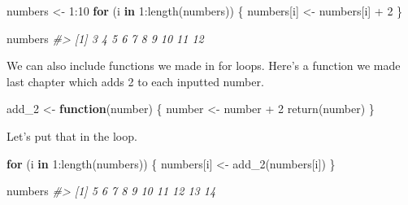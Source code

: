 \documentclass[
]{krantz}
\makeatletter
\newenvironment{Shaded}{\begin{snugshade}}{\end{snugshade}}
\newcommand{\CommentTok}[1]{\textcolor[rgb]{0.37,0.37,0.37}{\textit{#1}}}
\newcommand{\ControlFlowTok}[1]{\textcolor[rgb]{0.27,0.27,0.27}{\textbf{#1}}}
\newcommand{\DecValTok}[1]{\textcolor[rgb]{0.06,0.06,0.06}{#1}}
\newcommand{\FunctionTok}[1]{\textcolor[rgb]{0,0,0}{#1}}
\newcommand{\NormalTok}[1]{#1}
\newcommand{\OtherTok}[1]{\textcolor[rgb]{0.37,0.37,0.37}{#1}}
\newcommand{\SpecialCharTok}[1]{\textcolor[rgb]{0,0,0}{#1}}
\newenvironment{kframe}{%
\medskip{}
\setlength{\fboxsep}{.8em}
 \def\at@end@of@kframe{}%
 \ifinner\ifhmode%
  \def\at@end@of@kframe{\end{minipage}}%
  \begin{minipage}{\columnwidth}%
 \fi\fi%
 \def\FrameCommand##1{\hskip\@totalleftmargin \hskip-\fboxsep
 \colorbox{shadecolor}{##1}\hskip-\fboxsep
     \hskip-\linewidth \hskip-\@totalleftmargin \hskip\columnwidth}%
 \MakeFramed {\advance\hsize-\width
   \@totalleftmargin\z@ \linewidth\hsize
   \@setminipage}}%
 {\par\unskip\endMakeFramed%
 \at@end@of@kframe}
\renewenvironment{Shaded}{\begin{kframe}}{\end{kframe}}
\makeatother
\begin{document}
\begin{Shaded}
\begin{Highlighting}[]
\NormalTok{numbers }\OtherTok{\textless{}{-}} \DecValTok{1}\SpecialCharTok{:}\DecValTok{10}
\ControlFlowTok{for}\NormalTok{ (i }\ControlFlowTok{in} \DecValTok{1}\SpecialCharTok{:}\FunctionTok{length}\NormalTok{(numbers)) \{}
\NormalTok{  numbers[i] }\OtherTok{\textless{}{-}}\NormalTok{ numbers[i] }\SpecialCharTok{+} \DecValTok{2}
\NormalTok{\}}
\end{Highlighting}
\end{Shaded}

\begin{Shaded}
\begin{Highlighting}[]
\NormalTok{numbers}
\CommentTok{\#\textgreater{}  [1]  3  4  5  6  7  8  9 10 11 12}
\end{Highlighting}
\end{Shaded}

We can also include functions we made in for loops. Here's a
function we made last chapter which adds 2 to each inputted
number.

\begin{Shaded}
\begin{Highlighting}[]
\NormalTok{add\_2 }\OtherTok{\textless{}{-}} \ControlFlowTok{function}\NormalTok{(number) \{}
\NormalTok{  number }\OtherTok{\textless{}{-}}\NormalTok{ number }\SpecialCharTok{+} \DecValTok{2}
  \FunctionTok{return}\NormalTok{(number)}
\NormalTok{\}}
\end{Highlighting}
\end{Shaded}

Let's put that in the loop.

\begin{Shaded}
\begin{Highlighting}[]
\ControlFlowTok{for}\NormalTok{ (i }\ControlFlowTok{in} \DecValTok{1}\SpecialCharTok{:}\FunctionTok{length}\NormalTok{(numbers)) \{}
\NormalTok{  numbers[i] }\OtherTok{\textless{}{-}} \FunctionTok{add\_2}\NormalTok{(numbers[i])}
\NormalTok{\}}
\end{Highlighting}
\end{Shaded}

\begin{Shaded}
\begin{Highlighting}[]
\NormalTok{numbers}
\CommentTok{\#\textgreater{}  [1]  5  6  7  8  9 10 11 12 13 14}
\end{Highlighting}
\end{Shaded}
\end{document}
